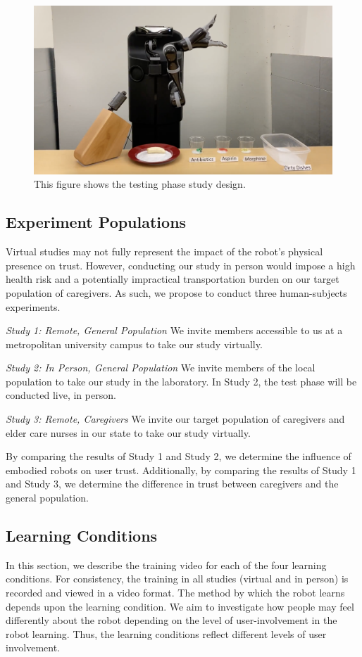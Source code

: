 \documentclass[letterpaper]{article} %
\begin{document}
\begin{figure}[ht]
\centering
\includegraphics[width=1\columnwidth]{Figures/testing_setup.png}
\caption{This figure shows the testing phase study design.}
\label{fig:study_setup}
\end{figure}

\subsection{Experiment Populations} \label{sec:humanexperiment}
Virtual studies may not fully represent the impact of the robot's physical presence on trust. However, conducting our study in person would impose a high health risk and a potentially impractical transportation burden on our target population of caregivers. As such, we propose to conduct three human-subjects experiments.

\indent \textit{Study 1: Remote, General Population} We invite members accessible to us at a metropolitan university campus to take our study virtually.

\indent \textit{Study 2: In Person, General Population} We invite members of the local population to take our study in the laboratory. In Study 2, the test phase will be conducted live, in person.

\indent \textit{Study 3: Remote, Caregivers} We invite our target population of caregivers and elder care nurses in our state to take our study virtually.

By comparing the results of Study 1 and Study 2, we determine the influence of embodied robots on user trust. Additionally, by comparing the results of Study 1 and Study 3, we determine the difference in trust between caregivers and the general population.

\subsection{Learning Conditions}
\label{sec:conditions}
In this section, we describe the training video for each of the four learning conditions. For consistency, the training in all studies (virtual and in person) is recorded and viewed in a video format. The method by which the robot learns depends upon the learning condition. We aim to investigate how people may feel differently about the robot depending on the level of user-involvement in the robot learning. Thus, the learning conditions reflect different levels of user involvement.
\end{document}
